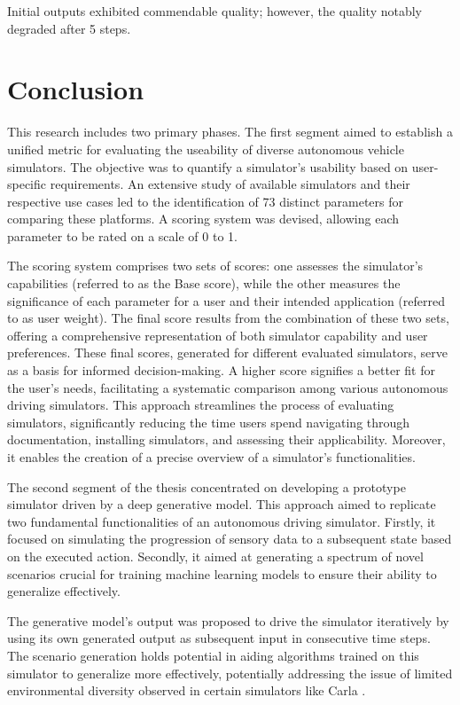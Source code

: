\documentclass[12pt,twoside,a4paper,parskip]{scrbook} %
\begin{document}
Initial outputs exhibited commendable quality; however, the quality notably degraded after 5 steps.

\chapter{Conclusion}
This research includes two primary phases. The first segment aimed to establish a unified metric for evaluating the useability of diverse autonomous vehicle simulators. The objective was to quantify a simulator's usability based on user-specific requirements. An extensive study of available simulators and their respective use cases led to the identification of 73 distinct parameters for comparing these platforms. A scoring system was devised, allowing each parameter to be rated on a scale of 0 to 1.

The scoring system comprises two sets of scores: one assesses the simulator's capabilities (referred to as the Base score), while the other measures the significance of each parameter for a user and their intended application (referred to as user weight). The final score results from the combination of these two sets, offering a comprehensive representation of both simulator capability and user preferences. These final scores, generated for different evaluated simulators, serve as a basis for informed decision-making. A higher score signifies a better fit for the user's needs, facilitating a systematic comparison among various autonomous driving simulators. This approach streamlines the process of evaluating simulators, significantly reducing the time users spend navigating through documentation, installing simulators, and assessing their applicability. Moreover, it enables the creation of a precise overview of a simulator's functionalities.

The second segment of the thesis concentrated on developing a prototype simulator driven by a deep generative model. This approach aimed to replicate two fundamental functionalities of an autonomous driving simulator. Firstly, it focused on simulating the progression of sensory data to a subsequent state based on the executed action. Secondly, it aimed at generating a spectrum of novel scenarios crucial for training machine learning models to ensure their ability to generalize effectively.

The generative model's output was proposed to drive the simulator iteratively by using its own generated output as subsequent input in consecutive time steps. The scenario generation holds potential in aiding algorithms trained on this simulator to generalize more effectively, potentially addressing the issue of limited environmental diversity observed in certain simulators like Carla \cite{Carla}.
\end{document}

